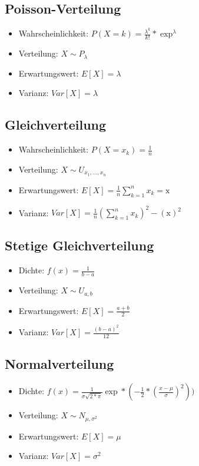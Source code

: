 \documentclass[10pt,landscape,a4paper]{article}
\begin{document}
\begin{multicols}{3}
\subsection{Poisson-Verteilung}
\begin{itemize}
	\setlength\itemsep{-0.5em}
	\item Wahrscheinlichkeit: $P(X=k) = \frac{\lambda^k}{k!} * \exp^{\lambda}$
	\item Verteilung: $X \sim P_{\lambda}$
	\item Erwartungswert: $E[X] = \lambda$
	\item Varianz: $Var[X] = \lambda$
\end{itemize}

\subsection{Gleichverteilung}
\begin{itemize}
	\setlength\itemsep{-0.5em}
	\item Wahrscheinlichkeit: $P(X=x_k) = \frac{1}{n}$
	\item Verteilung: $X \sim U_{x_1,...,x_n}$
	\item Erwartungswert: $E[X] = \frac{1}{n} \sum\limits_{k=1}^n x_k = \text{\={x}}$
	\item Varianz: $Var[X] = \frac{1}{n} (\sum\limits_{k=1}^n x_k)^2 - (\text{\={x}})^2$
\end{itemize}

\subsection{Stetige Gleichverteilung}
\begin{itemize}
	\setlength\itemsep{-0.5em}
	\item Dichte: $f(x) = \frac{1}{b-a}$
	\item Verteilung: $X \sim U_{a,b}$
	\item Erwartungswert: $E[X] = \frac{a+b}{2}$
	\item Varianz: $Var[X] = \frac{(b-a)^2}{12}$
\end{itemize}

\subsection{Normalverteilung}
\begin{itemize}
	\setlength\itemsep{-0.5em}
	\item Dichte: $f(x) = \frac{1}{\sigma \sqrt{2*\pi}} \exp * (-\frac{1}{2} * (\frac{x-\mu}{\sigma})^2))$
	\item Verteilung: $X \sim N_{\mu, \sigma^2}$
	\item Erwartungswert: $E[X] = \mu$
	\item Varianz: $Var[X] = \sigma^2$
\end{itemize}


\end{multicols}
\end{document}
